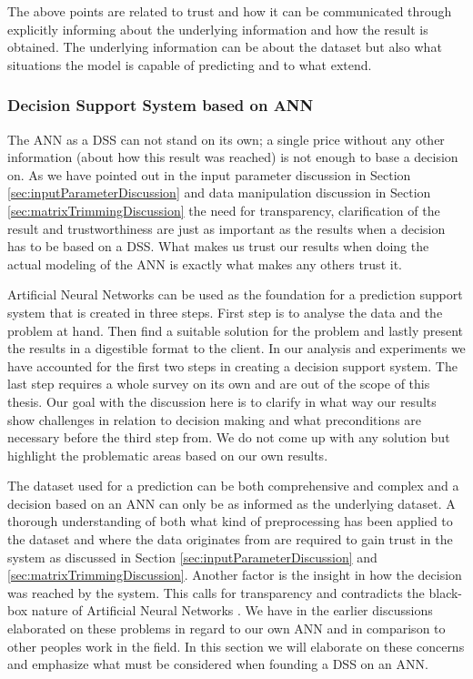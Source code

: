 The above points are related to trust and how it can be communicated through explicitly informing about the underlying information and how the result is obtained. The underlying information can be about the dataset but also what situations the model is capable of predicting and to what extend.

\subsubsection{Decision Support System based on ANN}
The ANN as a DSS can not stand on its own; a single price without any other information (about how this result was reached) is not enough to base a decision on. As we have pointed out in the input parameter discussion in Section \ref{sec:inputParameterDiscussion} and data manipulation discussion in Section \ref{sec:matrixTrimmingDiscussion} the need for transparency, clarification of the result and trustworthiness are just as important as the results when a decision has to be based on a DSS. What makes us trust our results when doing the actual modeling of the ANN is exactly what makes any others trust it.

Artificial Neural Networks can be used as the foundation for a prediction support system that is created in three steps\cite{shim2002past}. First step is to analyse the data and the problem at hand. Then find a suitable solution for the problem and lastly present the results in a digestible format to the client. In our analysis and experiments we have accounted for the first two steps in creating a decision support system. The last step requires a whole survey on its own and are out of the scope of this thesis. Our goal with the discussion here is to clarify in what way our results show challenges in relation to decision making and what preconditions are necessary before the third step from\cite{shim2002past}. We do not come up with any solution but highlight the problematic areas based on our own results. 

The dataset used for a prediction can be both comprehensive and complex and a decision based on an ANN can only be as informed as the underlying dataset. A thorough understanding of both what kind of preprocessing has been applied to the dataset and where the data originates from are required to gain trust in the system as discussed in Section \ref{sec:inputParameterDiscussion} and \ref{sec:matrixTrimmingDiscussion}. Another factor is the insight in how the decision was reached by the system. This calls for transparency and contradicts the black-box nature of Artificial Neural Networks \cite{fromBlackBoxToTransparentBox}. We have in the earlier discussions elaborated on these problems in regard to our own ANN and in comparison to other peoples work in the field. In this section we will elaborate on these concerns and emphasize what must be considered when founding a DSS on an ANN.

